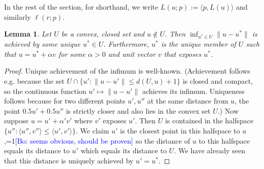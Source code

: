 \documentclass[12pt]{article}
\newcommand{\Comments}{1}
\newcommand{\mynote}[2]{\ifnum\Comments=1\textcolor{#1}{#2}\fi}
\newcommand{\bo}[1]{\mynote{blue}{[Bo: #1]}}
\newtheorem{lemma}{Lemma}
\begin{document}
In the rest of the section, for shorthand, we write $L(u;p) := \langle p, L(u) \rangle$ and similarly $\ell(r;p)$.

\begin{lemma} \label{lemma:exposed-shortest}
  Let $U$ be a convex, closed set and $u \not\in U$.
  Then $\inf_{u^* \in U} \|u-u^*\|$ is achieved by some unique $u^* \in U$.
  Furthermore, $u^*$ is the unique member of $U$ such that $u = u^* + \alpha v$ for some $\alpha > 0$ and unit vector $v$ that exposes $u^*$.
\end{lemma}
\begin{proof}
  Unique achievement of the infimum is well-known.
  (Achievement follows e.g. because the set $U \cap \{u' : \|u - u'\| \leq d(U,u) + 1\}$ is closed and compact, so the continuous function $u' \mapsto \|u-u'\|$ achieves its infimum.
  Uniqueness follows because for two different points $u',u''$ at the same distance from $u$, the point $0.5u' + 0.5u''$ is strictly closer and also lies in the convex set $U$.)
  Now suppose $u = u' + \alpha' v'$ where $v'$ exposes $u'$.
  Then $U$ is contained in the halfspace $\{u'': \langle u'', v'' \rangle \leq \langle u',v' \rangle \}$.
  We claim $u'$ is the closest point in this halfspace to $u$,\bo{seems obvious, should be proven} so the distance of $u$ to this halfspace equals its distance to $u'$ which equals its distance to $U$.
  We have already seen that this distance is uniquely achieved by $u' = u^*$.
\end{proof}
\end{document}
